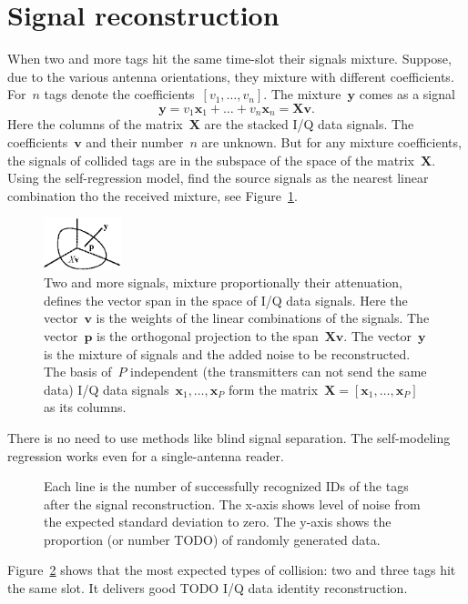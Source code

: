 \documentclass[12pt]{article}
\newcommand{\bx}{\mathbf{x}}
\begin{document}
\newcommand{\bX}{\mathbf{X}}
\newcommand{\bv}{\mathbf{v}}
\newcommand{\bp}{\mathbf{p}}
\newcommand{\by}{\mathbf{y}}
\newcommand{\beps}{\boldsymbol{\epsilon}}

\section{Signal reconstruction}
When two and more tags hit the same time-slot their signals mixture. Suppose, due to the various antenna orientations, they mixture with different coefficients. For~$n$ tags denote the coefficients~$[v_1, \dots, v_n]$. The mixture~$\by$ comes as a signal
\[
\by = v_1 \bx_1 + \dots + v_n \bx_n = \bX\bv.
\] 
Here the columns of the matrix~$\bX$ are the stacked I/Q data signals. 
The coefficients~$\bv$ and their number~$n$ are unknown. But for any mixture coefficients, the signals of collided tags are in the subspace of the space of the matrix~$\bX$. Using the self-regression model, find the source signals as the nearest linear combination tho the received mixture, see Figure~\ref{fig:lsq}. 
\begin{figure}[!t]
\centering
\includegraphics[width=0.2\textwidth]{fig_LeastSquaresProjection}
\caption{Two and more signals, mixture proportionally their attenuation, defines the vector span in the space of I/Q data signals. Here the vector~$\bv$ is the weights of the linear combinations of the signals. The vector~$\bp$ is the orthogonal projection to the span~$\bX\bv$. The vector~$\by$ is the mixture of signals and the added noise to be reconstructed. The basis of~$P$ independent (the transmitters can not send the same data) I/Q data 
signals~$\bx_1,\ldots,\bx_P$ form the matrix~$\bX=[\bx_1,\ldots,\bx_P]$ as its columns.}
\label{fig:lsq}
\end{figure}
There is no need to use methods like blind signal separation. The self-modeling regression works even for a single-antenna reader. 

\begin{figure}[!htbp]
\centering
\caption{Each line is the number of successfully recognized IDs of the tags after the signal reconstruction. The x-axis shows level of noise from the expected standard deviation to zero. The y-axis shows the proportion (or number TODO) of randomly generated data.}
\label{fig:reconstruction}
\end{figure}
Figure~\ref{fig:reconstruction} shows that the most expected types of collision: two and three tags hit the same slot. It delivers good TODO I/Q data identity reconstruction.
\end{document}
